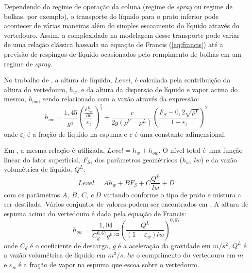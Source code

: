 Dependendo do regime de operação da coluna (regime de \textit{spray} ou regime de bolhas, por exemplo),
o transporte
do líquido para o prato inferior pode acontecer de várias maneiras além do simples escoamento do líquido através
do vertedouro. Assim, a complexidade na modelagem desse transporte pode variar de uma relação clássica baseada na
equação de Francis (\autoref{eq:francis}) até a previsão de respingos de líquido
ocasionados pelo rompimento de bolhas em um regime de \textit{spray}.

No trabalho de , a altura de líquido, $Level$, é calculada pela contribuição da
altura do vertedouro, $h_w$, e da altura da dispersão de líquido e vapor acima do mesmo, $h_{ow}$, sendo relacionada
com a vazão através da expressão:
\begin{equation}
h_{ow} = \dfrac{1,45}{g^{\frac{1}{3}}} \left( \dfrac{\frac{F_{out}^L}{lw}}{\varepsilon_l}\right)^{\frac{2}{3}} + \dfrac{c}{2g\left( \rho^V - \rho^L \right)} \left( \dfrac{F_S - 0,2\sqrt{\rho^V}} {1 - \varepsilon_l} \right)^2 
\end{equation}
onde $\varepsilon_l$ é a fração de líquido na espuma e $c$ é uma constante adimensional.

Em , a mesma relação é utilizada, $Level = h_w + h_{ow}$. O nível total é uma função linear
do fator superficial, $F_S$, dos parâmetros geométricos ($h_w$, $lw$) e da
vazão volumétrica de líquido, $Q^L$:
\begin{equation}
Level = A h_w + B F_S + C \dfrac{Q^L}{lw} + D
\end{equation}
com os parâmetros $A,\ B,\ C,\ e\ D$ variando conforme o tipo de prato e mistura a ser destilada. Vários conjuntos
de valores podem ser encontrados em .
A altura de espuma acima do vertedouro é dada pela equação de Francis:
\begin{equation}
\label{eq:francis}
h_{ow} = \dfrac{1,04}{C_d^{0,67} g^{0,33}} \left(
\dfrac{Q^L}{\left(1-\varepsilon_w \right) lw } \right)^{0,67}
\end{equation}
onde $C_d$ é o coeficiente de descarga, $g$ é a aceleração da gravidade em
$m/s^2$, $Q^L$ é a vazão volumétrica de líquido em $m^3/s$, $lw$ o comprimento do vertedouro em $m$ e $\varepsilon_w$ é a fração de vapor na espuma que escoa sobre o
vertedouro.

